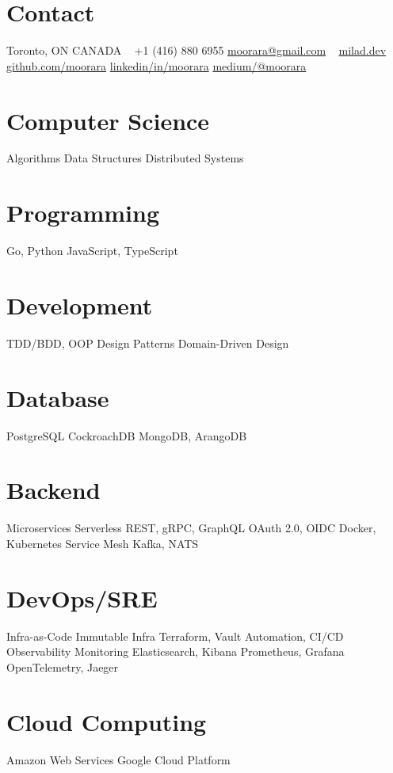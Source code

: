 \documentclass[]{cv-style}                     %
\begin{document}
\lastupdated



\begin{aside}
%
\section{Contact}
Toronto, ON  CANADA
~
+1 (416) 880 6955
\href{mailto:moorara@gmail.com}{moorara@gmail.com}
~
\href{https://milad.dev}{milad.dev}
\href{https://github.com/moorara}{github.com/moorara}
\href{https://linkedin.com/in/moorara}{linkedin/in/moorara}
\href{https://medium.com/@moorara}{medium/@moorara}
%
\section{Computer Science}
Algorithms
Data Structures
Distributed Systems
%
\section{Programming}
Go, Python
JavaScript, TypeScript
%
\section{Development}
TDD/BDD, OOP
Design Patterns
Domain-Driven Design
%
\section{Database}
PostgreSQL
CockroachDB
MongoDB, ArangoDB
%
\section{Backend}
Microservices
Serverless
REST, gRPC, GraphQL
OAuth 2.0, OIDC
Docker, Kubernetes
Service Mesh
Kafka, NATS
%
%
\section{DevOps/SRE}
Infra-as-Code
Immutable Infra
Terraform, Vault
Automation, CI/CD
Observability
Monitoring
Elasticsearch, Kibana
Prometheus, Grafana
OpenTelemetry, Jaeger
%
\section{Cloud Computing}
Amazon Web Services
Google Cloud Platform
%
%
\end{aside}
\end{document}
